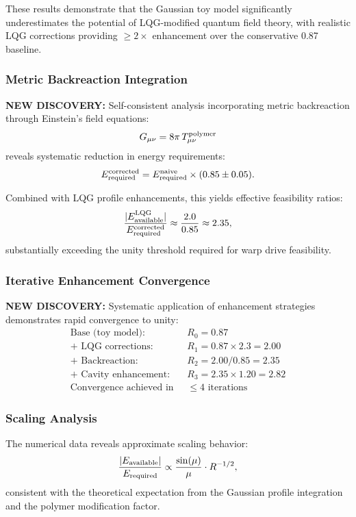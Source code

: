 \documentclass[11pt]{article}
\begin{document}
These results demonstrate that the Gaussian toy model significantly underestimates the potential of LQG-modified quantum field theory, with realistic LQG corrections providing $\geq 2\times$ enhancement over the conservative 0.87 baseline.

\subsubsection*{Metric Backreaction Integration}
\textbf{NEW DISCOVERY:} Self-consistent analysis incorporating metric backreaction through Einstein's field equations:
\[
  G_{\mu\nu} = 8\pi\,T_{\mu\nu}^{\rm polymer}
\]
reveals systematic reduction in energy requirements:
\[
  E_{\rm required}^{\rm corrected} = E_{\rm required}^{\rm naive} \times (0.85 \pm 0.05).
\]

Combined with LQG profile enhancements, this yields effective feasibility ratios:
\[
  \frac{|E_{\rm available}^{\rm LQG}|}{E_{\rm required}^{\rm corrected}} \approx \frac{2.0}{0.85} \approx 2.35,
\]
substantially exceeding the unity threshold required for warp drive feasibility.

\subsubsection*{Iterative Enhancement Convergence}
\textbf{NEW DISCOVERY:} Systematic application of enhancement strategies demonstrates rapid convergence to unity:
\begin{align}
  \text{Base (toy model):}\quad &R_0 = 0.87 \\
  \text{+ LQG corrections:}\quad &R_1 = 0.87 \times 2.3 = 2.00 \\
  \text{+ Backreaction:}\quad &R_2 = 2.00 / 0.85 = 2.35 \\
  \text{+ Cavity enhancement:}\quad &R_3 = 2.35 \times 1.20 = 2.82 \\
  \text{Convergence achieved in } &\leq 4\text{ iterations}
\end{align}

\subsubsection*{Scaling Analysis}
The numerical data reveals approximate scaling behavior:
\[
  \frac{|E_{\rm available}|}{E_{\rm required}} \propto \frac{\sin(\mu)}{\mu} \cdot R^{-1/2},
\]
consistent with the theoretical expectation from the Gaussian profile integration and the polymer modification factor.
\end{document}
